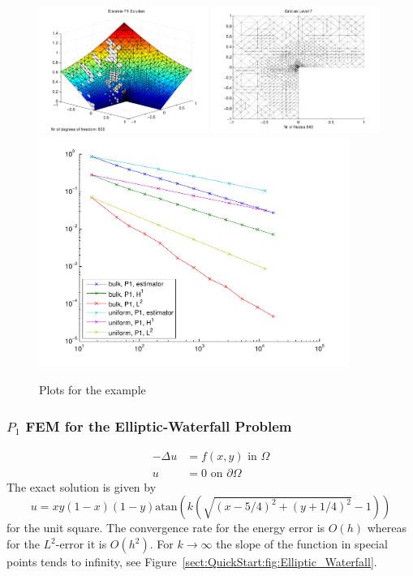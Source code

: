 \begin{figure}[ht!]
\includegraphics[width= 0.49\textwidth]{images/sect_QuickStart_Elliptic_Lshape_exact_U}
\includegraphics[width= 0.49\textwidth]{images/sect_QuickStart_Elliptic_Lshape_exact_Mesh}\bigskip\\
\includegraphics[width=0.9\textwidth]{images/sect_QuickStart_Elliptic_Lshape_exact_Error}
\caption{ Plots for the example }
\label{sect:QuickStart:fig:Elliptic_Lshape_exact}
\end{figure}

\clearpage

\subsubsection{$P_1$ FEM for the Elliptic-Waterfall Problem}
\begin{align*}
-\Delta u &= f(x,y) \textrm{ in } \Omega\\
 u &= 0 \textrm{ on } \partial\Omega
\end{align*}
The exact solution is given by 
\[u = xy(1-x)(1-y)\textrm{atan}(k(\sqrt{(x-5/4)^2 + (y+1/4)^2}-1))\]
for the unit square. 
The convergence rate for the energy error is $O(h)$ 
whereas for the $L^2$-error it is $O(h^2)$. 
For $k\to\infty$ the slope of the function in special points tends to infinity, see Figure~\ref{sect:QuickStart:fig:Elliptic_Waterfall}.\bigskip

